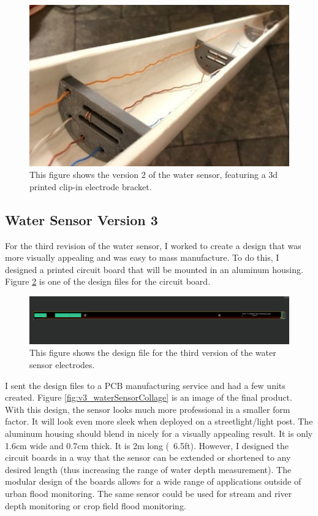 \documentclass[letter]{article}
\begin{document}
\begin{figure}[ht]
	\centering
	\includegraphics[width=.6\textwidth]{img/v2_waterSensor.jpg}
	\caption{\label{fig:v2_waterSensor} This figure shows the version 2 of the water sensor, featuring a 3d printed clip-in electrode bracket.}
\end{figure}

\subsection{Water Sensor Version 3}
For the third revision of the water sensor, I worked to create a design that was more visually appealing and was easy to mass manufacture. To do this, I designed a printed circuit board that will be mounted in an aluminum housing. Figure \ref{fig:v3_waterSensor} is one of the design files for the circuit board.

\begin{figure}[ht]
	\centering
	\includegraphics[width=1\textwidth]{img/v3_waterSensor.png}
	\caption{\label{fig:v3_waterSensor} This figure shows the design file for the third version of the water sensor electrodes.}
\end{figure}

 I sent the design files to a PCB manufacturing service and had a few units created. Figure \ref{fig:v3_waterSensorCollage} is an image of the final product. With this design, the sensor looks much more professional in a smaller form factor. It will look even more sleek when deployed on a streetlight/light post. The aluminum housing should blend in nicely for a visually appealing result. It is only 1.6cm wide and 0.7cm thick. It is 2m long (~6.5ft). However, I designed the circuit boards in a way that the sensor can be extended or shortened to any desired length (thus increasing the range of water depth measurement). The modular design of the boards allows for a wide range of applications outside of urban flood monitoring. The same sensor could be used for stream and river depth monitoring or crop field flood monitoring. 
\end{document}
